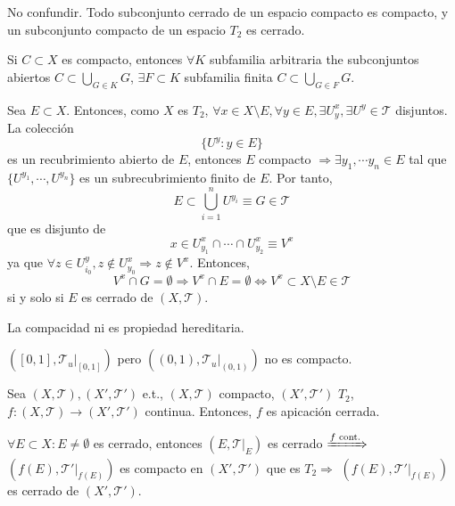 
\begin{obs}
  No confundir. Todo subconjunto cerrado de un espacio compacto es compacto, y un subconjunto compacto de un espacio $T_{2}$ es cerrado.
\end{obs}

\begin{obs}
  Si $C \subset X$ es compacto, entonces $\forall K$ subfamilia arbitraria the subconjuntos abiertos $C \subset \bigcup_{G \in K} G$, $\exists F \subset K$ subfamilia finita $C \subset \bigcup_{G \in F} G$.
\end{obs}

\begin{dem}
  Sea $E \subset X$. Entonces, como $X$ es $T_{2}$, $\forall x \in X \setminus E, \forall y \in E, \exists U^{x}_{y}, \exists U^{y} \in \mathcal{T}$ disjuntos. La colección
  \[
    \{ U^{y} : y \in E \}
  \]
  es un recubrimiento abierto de $E$, entonces $E$ compacto $\Rightarrow \exists y_{1}, \cdots y_{n} \in E$ tal que $\{ U^{y_{1}} , \cdots, U^{y_{n}} \}$ es un subrecubrimiento finito de $E$. Por tanto,
  \[ 
    E \subset \bigcup_{i = 1}^{n} U^{y_{i}} \equiv G \in \mathcal{T}
  \] 
  que es disjunto de
  \[ 
    x \in U^{x}_{y_{1}} \cap \cdots \cap U^{x}_{y_{2}} \equiv V^{x}
  \] 
  ya que $\forall z \in U^{y}_{i_{0}}, z \not \in U^{x}_{y_{0}} \Rightarrow z \not \in V^{x}$. Entonces, 
  \[ 
    V^{x} \cap G = \emptyset \Rightarrow V^{x} \cap E = \emptyset \Leftrightarrow V^{x} \subset X \setminus E \in \mathcal{T}
  \] 
  si y solo si $E$ es cerrado de $( X, \mathcal{T} )$.
\end{dem}

\begin{obs}
  La compacidad ni es propiedad hereditaria.
\end{obs}

\begin{ejm}
  $( [0, 1], \mathcal{T}_{u}|_{[0,1]} )$ pero $( (0,1), \mathcal{T}_{u}|_{(0,1)} )$ no es compacto.
\end{ejm}

\begin{prop}
  Sea $( X, \mathcal{T} ), ( X', \mathcal{T}' )$ e.t., $( X, \mathcal{T} )$ compacto, $( X', \mathcal{T}' )$ $T_{2}$, $f : ( X, \mathcal{T} ) \to ( X', \mathcal{T}' )$ continua. Entonces, $f$ es apicación cerrada.
\end{prop}

\begin{dem}
  $\forall E \subset X : E \neq \emptyset$ es cerrado, entonces $( E, \mathcal{T}|_{E})$ es cerrado $\xRightarrow[]{ f \text{ cont.} }$ $( f(E), \mathcal{T}'|_{f(E)})$ es compacto en $( X', \mathcal{T}' )$ que es $T_{2} \Rightarrow$ $( f(E), \mathcal{T}'|_{f(E)})$ es cerrado de $( X', \mathcal{T}' )$.
\end{dem}

